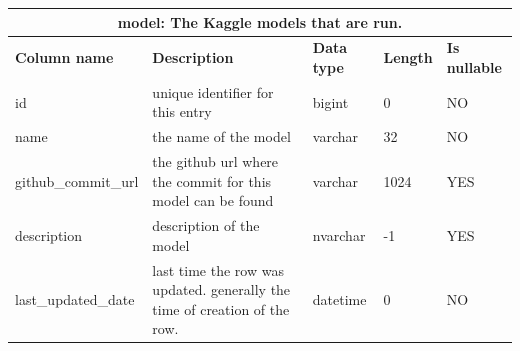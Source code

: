 \documentclass[titlepage, 11pt]{article}
\begin{document}
{\begin{table}[h!]
{\renewcommand{\arraystretch}{1.5}%
\begin{tabularx}{1\textwidth} {|p{4cm}|p{5.33cm}|p{2cm}|p{1.5cm}|p{1.5cm}|}
 \hline
 \multicolumn{5}{|c|}{\textbf{model: The Kaggle models that are run. }}\\
 \hline
 \textbf{Column name} & \textbf{Description} & \textbf{Data type} & \textbf{Length} & \textbf{Is nullable} \\
 \hline
 id & unique identifier for this entry & bigint   & 0  & NO  \\
 \hline
 name  & the name of the model & varchar  & 32 & NO  \\
 \hline
 github\_commit\_url & the github url where the commit for this model can be found & varchar  & 1024 & YES \\
 \hline
description & description of the model  & nvarchar & -1 & YES \\
\hline
last\_updated\_date & last time the row was updated. generally the time of creation of the row. & datetime & 0 & NO  \\
\hline

\end{tabularx}
\label{table: appendix b - model}
}
\end{table}

\begin{table}[h!]


\end{table}}
\end{document}
